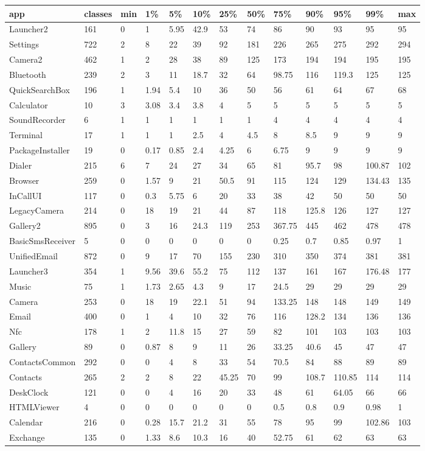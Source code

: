 \begin{tabular}{|l|l|l|l|l|l|l|l|l|l|l|l|l|}
\hline
app&classes&min&1\%&5\%&10\%&25\%&50\%&75\%&90\%&95\%&99\%&max\\
\hline
Launcher2&161&0&1&5.95&42.9&53&74&86&90&93&95&95\\
\hline
Settings&722&2&8&22&39&92&181&226&265&275&292&294\\
\hline
Camera2&462&1&2&28&38&89&125&173&194&194&195&195\\
\hline
Bluetooth&239&2&3&11&18.7&32&64&98.75&116&119.3&125&125\\
\hline
QuickSearchBox&196&1&1.94&5.4&10&36&50&56&61&64&67&68\\
\hline
Calculator&10&3&3.08&3.4&3.8&4&5&5&5&5&5&5\\
\hline
SoundRecorder&6&1&1&1&1&1&1&4&4&4&4&4\\
\hline
Terminal&17&1&1&1&2.5&4&4.5&8&8.5&9&9&9\\
\hline
PackageInstaller&19&0&0.17&0.85&2.4&4.25&6&6.75&9&9&9&9\\
\hline
Dialer&215&6&7&24&27&34&65&81&95.7&98&100.87&102\\
\hline
Browser&259&0&1.57&9&21&50.5&91&115&124&129&134.43&135\\
\hline
InCallUI&117&0&0.3&5.75&6&20&33&38&42&50&50&50\\
\hline
LegacyCamera&214&0&18&19&21&44&87&118&125.8&126&127&127\\
\hline
Gallery2&895&0&3&16&24.3&119&253&367.75&445&462&478&478\\
\hline
BasicSmsReceiver&5&0&0&0&0&0&0&0.25&0.7&0.85&0.97&1\\
\hline
UnifiedEmail&872&0&9&17&70&155&230&310&350&374&381&381\\
\hline
Launcher3&354&1&9.56&39.6&55.2&75&112&137&161&167&176.48&177\\
\hline
Music&75&1&1.73&2.65&4.3&9&17&24.5&29&29&29&29\\
\hline
Camera&253&0&18&19&22.1&51&94&133.25&148&148&149&149\\
\hline
Email&400&0&1&4&10&32&76&116&128.2&134&136&136\\
\hline
Nfc&178&1&2&11.8&15&27&59&82&101&103&103&103\\
\hline
Gallery&89&0&0.87&8&9&11&26&33.25&40.6&45&47&47\\
\hline
ContactsCommon&292&0&0&4&8&33&54&70.5&84&88&89&89\\
\hline
Contacts&265&2&2&8&22&45.25&70&99&108.7&110.85&114&114\\
\hline
DeskClock&121&0&0&4&16&20&33&48&61&64.05&66&66\\
\hline
HTMLViewer&4&0&0&0&0&0&0&0.5&0.8&0.9&0.98&1\\
\hline
Calendar&216&0&0.28&15.7&21.2&31&55&78&95&99&102.86&103\\
\hline
Exchange&135&0&1.33&8.6&10.3&16&40&52.75&61&62&63&63\\
\hline
\end{tabular}
